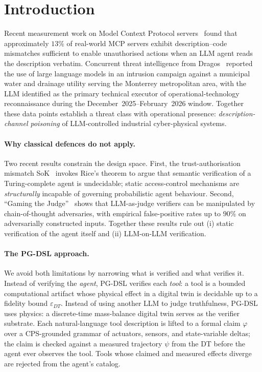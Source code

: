 \section{Introduction}
\label{sec:intro}

Recent measurement work on Model Context Protocol
servers~\cite{mcp_misleading} found that approximately $13\%$ of
real-world MCP servers exhibit description--code mismatches sufficient
to enable unauthorised actions when an LLM agent reads the description
verbatim. Concurrent threat intelligence from
Dragos~\cite{dragos_mexico_26} reported the use of large language
models in an intrusion campaign against a municipal water and drainage
utility serving the Monterrey metropolitan area, with the LLM
identified as the primary technical executor of operational-technology
reconnaissance during the December~2025--February~2026 window.
Together these data points establish a threat class with operational
presence: \emph{description-channel poisoning} of LLM-controlled
industrial cyber-physical systems.

\paragraph{Why classical defences do not apply.}
Two recent results constrain the design space. First, the
trust-authorisation mismatch SoK~\cite{trust_auth_sok} invokes Rice's
theorem to argue that semantic verification of a Turing-complete agent
is undecidable; static access-control mechanisms are
\emph{structurally} incapable of governing probabilistic agent
behaviour. Second, ``Gaming the Judge''~\cite{gaming_judge} shows that
LLM-as-judge verifiers can be manipulated by chain-of-thought adversaries,
with empirical false-positive rates up to $90\%$ on adversarially
constructed inputs. Together these results rule out (i) static
verification of the agent itself and (ii) LLM-on-LLM verification.

\paragraph{The PG-DSL approach.}
We avoid both limitations by narrowing what is verified and what
verifies it. Instead of verifying the \emph{agent}, PG-DSL verifies
each \emph{tool}: a tool is a bounded computational artifact whose
physical effect in a digital twin is decidable up to a fidelity bound
$\varepsilon_{DT}$. Instead of using another LLM to judge truthfulness,
PG-DSL uses physics: a discrete-time mass-balance digital twin
serves as the verifier substrate. Each natural-language tool
description is lifted to a formal claim $\varphi$ over a CPS-grounded
grammar of actuators, sensors, and state-variable
deltas; the claim is checked against a measured trajectory $\psi$ from
the DT before the agent ever observes the tool. Tools whose claimed
and measured effects diverge are rejected from the agent's catalog.

